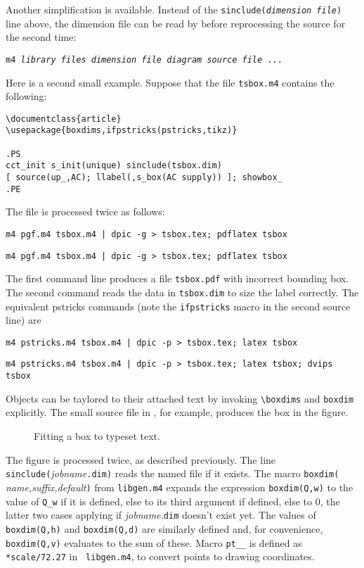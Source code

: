 Another simplification is available.  Instead of the
{\tt sinclude({\sl dimension file})} line
above, the dimension file can be read by \Mfour before reprocessing the source
for the second time:

{\tt m4 {\sl library files} {\sl dimension file} {\sl diagram source file} ...} 

Here is a second small example.  Suppose that the file {\tt tsbox.m4} contains
the following:
\begin{verbatim}
\documentclass{article}
\usepackage{boxdims,ifpstricks(pstricks,tikz)}

.PS
cct_init s_init(unique) sinclude(tsbox.dim)
[ source(up_,AC); llabel(,s_box(AC supply)) ]; showbox_
.PE

\end{verbatim}
The file is processed twice as follows:

{\tt m4 pgf.m4 tsbox.m4 | dpic -g > tsbox.tex; pdflatex tsbox}
\par
{\tt m4 pgf.m4 tsbox.m4 | dpic -g > tsbox.tex; pdflatex tsbox}

\noindent
The first command line produces a file {\tt tsbox.pdf} with
incorrect bounding box.  The second command reads the data in {\tt tsbox.dim}
to size the label correctly.  The equivalent pstricks commands (note
the {\tt ifpstricks} macro in the second source line) are

{\tt m4 pstricks.m4 tsbox.m4 | dpic -p > tsbox.tex; latex tsbox}
\par
{\tt m4 pstricks.m4 tsbox.m4 | dpic -p > tsbox.tex; latex tsbox; dvips tsbox}
 
\hbox{}

Objects can be taylored to their attached text by invoking
\verb|\boxdims| and \verb|boxdim| explicitly.
The small source file in , for example,
produces the box in the figure.
\begin{figure}[h!t]
   \parbox{4.2in}{\small  }%
   \hfill\llap{\raise-0.35in\hbox{ }}%
   \vspace{-\baselineskip}
   \caption{Fitting a box to typeset text.}
   \label{boxdims}
   \end{figure}

The figure is processed twice, as described previously.
The line \verb|sinclude(|{\sl jobname}\verb|.dim)| reads the named file
if it exists.  The macro \verb|boxdim(|{\sl
name,suffix,default}\verb|)| from {\tt libgen.m4} expands the
expression \verb|boxdim(Q,w)| to the value of \verb|Q_w| if it is
defined, else to its third argument if defined, else to 0, the latter
two cases applying if {\sl jobname.}\verb|dim| doesn't exist yet.  The
values of \verb|boxdim(Q,h)| and \verb|boxdim(Q,d)| are similarly
defined and, for convenience, \verb|boxdim(Q,v)| evaluates to the sum
of these.  Macro \verb|pt__| is defined as \verb|*scale/72.27| in {\tt
libgen.m4}, to convert points to drawing coordinates.

